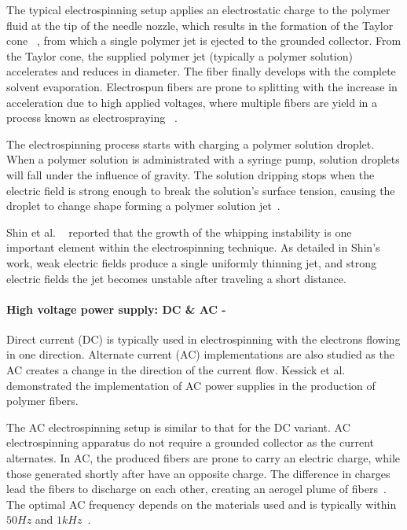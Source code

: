 \documentclass[5p,,preprint,12pt,twocolumn]{elsarticle}
\begin{document}
The typical electrospinning setup applies an electrostatic charge to the polymer fluid at the tip of the needle nozzle, which results in the formation of the Taylor cone \unskip~\cite{527120:13659828}, from which a single polymer jet is ejected to the grounded collector. From the Taylor cone, the supplied polymer jet (typically a polymer solution) accelerates and reduces in diameter. The fiber finally develops with the complete solvent evaporation. Electrospun fibers are prone to splitting with the increase in acceleration due to high applied voltages, where multiple fibers are yield in a process known as electrospraying \unskip~\cite{527120:13659925}.

The electrospinning process starts with charging a polymer solution droplet. When a polymer solution is administrated with a syringe pump, solution droplets will fall under the influence of gravity. The solution dripping stops when the electric field is strong enough to break the solution's surface tension, causing the droplet to change shape forming a polymer solution jet\unskip~\cite{527120:12033655}.

Shin et al. \unskip~\cite{527120:13659926} reported that the growth of the whipping instability is one important element within the electrospinning technique. As detailed in Shin's work, weak electric fields produce a single uniformly thinning jet, and strong electric fields the jet becomes unstable after traveling a short distance.



\paragraph{High voltage power supply: DC \& AC - }Direct current (DC) is typically used in electrospinning with the electrons flowing in one direction. Alternate current (AC) implementations are also studied as the AC creates a change in the direction of the current flow. Kessick et al.\unskip~\cite{527120:13444381} demonstrated the implementation of AC power supplies in the production of polymer fibers.

The AC electrospinning setup is similar to that for the DC variant. AC electrospinning apparatus do not require a grounded collector as the current alternates. In AC, the produced fibers are prone to carry an electric charge, while those generated shortly after have an opposite charge. The difference in charges lead the fibers to discharge on each other, creating an aerogel plume of fibers\unskip~\cite{527120:16885570}. The optimal AC frequency depends on the materials used and is typically within  $50Hz $ and  $1kHz $\unskip~\cite{527120:13443405}.
\end{document}
